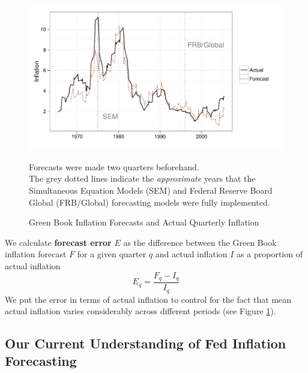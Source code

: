 \documentclass[a4paper]{article}\usepackage{graphicx, color}
\newenvironment{knitrout}{}{} %
\begin{document}
\begin{figure}[t]
    \caption{Green Book Inflation Forecasts and Actual Quarterly Inflation}
    \label{absolute}
    \begin{center}
    
\begin{knitrout}
\color{fgcolor}\includegraphics[width=0.8\linewidth]{figure/BaseInflation} 
\end{knitrout}

    
    \end{center}
    \begin{singlespace}
        {\scriptsize{Forecasts were made two quarters beforehand. \\
                     The grey dotted lines indicate the {\emph{approximate}} years that the Simultaneous Equation Models (SEM) and Federal Reserve Board Global (FRB/Global) forecasting models were fully implemented.  
                      }}
    \end{singlespace}
\end{figure}

We calculate {\bf{forecast error}} $E$ as the difference between the Green Book inflation forecast $F$ for a given quarter $q$ and actual inflation $I$ as a proportion of actual inflation
%
\begin{equation}
    E_{q} = \frac{F_{q} - I_{q}}{I_{q}}
\end{equation}
%
We put the error in terms of actual inflation to control for the fact that mean actual inflation varies considerably across different periods (see Figure \ref{absolute}). 


\subsection{Our Current Understanding of Fed Inflation Forecasting}
\end{document}
